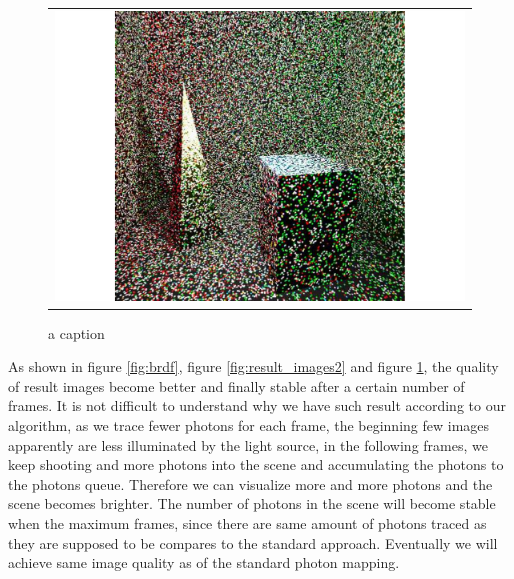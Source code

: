 \begin{figure}
\begin{center}
{\begin{tabular}{c}
\includegraphics*[scale=0.25]{imgs/pqv_frame9.pdf}
\end{tabular}
}%
\caption{a caption}
\end{center}
\label{fig:result_images3}
\end{figure}

As shown in figure \ref{fig:brdf}, figure \ref{fig:result_images2} and figure \ref{fig:result_images3}, the quality of 	result images become better and finally stable after a certain number of frames. It is not difficult to understand why we have such result according to our algorithm, as we trace fewer photons for each frame, the beginning few images apparently are less illuminated by the light source, in the following frames, we keep shooting and more photons into the scene and accumulating the photons to the photons queue. Therefore we can visualize more and more photons and the scene becomes brighter. The number of photons in the scene will become stable when the maximum frames, since there are same amount of photons traced as they are supposed to be compares to the standard approach. Eventually we will achieve same image quality as of the standard photon mapping. 


